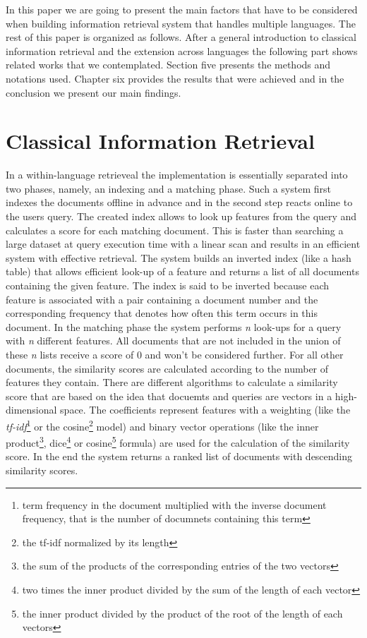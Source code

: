 \documentclass[journal]{IEEEtran}
\begin{document}
In this paper we are going to present the main factors that have to be considered when building information retrieval system that handles multiple languages.
The rest of this paper is organized as follows.
After a general introduction to classical information retrieval and the extension across languages the following part shows related works that we contemplated.
Section five presents the methods and notations used.
Chapter six provides the results that were achieved and in the conclusion we present our main findings.


\section{Classical Information Retrieval}
In a within-language retrieveal the implementation is essentially separated into two phases, namely, an indexing and a matching phase.
Such a system first indexes the documents offline in advance and in the second step reacts online to the users query.
The created index allows to look up features from the query and calculates a score for each matching document.
This is faster than searching a large dataset at query execution time with a linear scan and results in an efficient system with effective retrieval.
The system builds an inverted index (like a hash table) that allows efficient look-up of a feature and returns a list of all documents containing the given feature.
The index is said to be inverted because each feature is associated with a pair containing a document number and the corresponding frequency that denotes how often this term occurs in this document.
In the matching phase the system performs {\it n} look-ups for a query with {\it n} different features.
All documents that are not included in the union of these {\it n} lists receive a score of 0 and won't be considered further.
For all other documents, the similarity scores are calculated according to the number of features they contain.
There are different algorithms to calculate a similarity score that are based on the idea that docuemts and queries are vectors in a high-dimensional space.
The coefficients represent features with a weighting (like the {\it tf-idf}\footnote{term frequency in the document multiplied with the inverse document frequency, that is the number of documnets containing this term} or the cosine\footnote{the tf-idf normalized by its length} model) and binary vector operations (like the inner product\footnote{the sum of the products of the corresponding entries of the two vectors}, dice\footnote{two times the inner product divided by the sum of the length of each vector} or cosine\footnote{the inner product divided by the product of the root of the length of each vectors} formula) are used for the calculation of the similarity score.
In the end the system returns a ranked list of documents with descending similarity scores.
\end{document}
